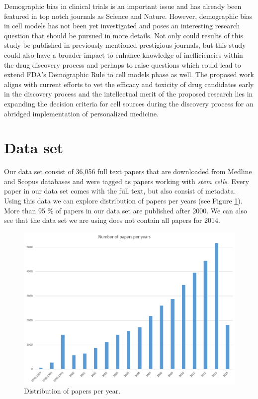 \documentclass[10pt]{article}
\begin{document}
Demographic bias in clinical trials is an important issue and has already been featured in top notch journals as Science and Nature. However, demographic bias in cell models has not been yet investigated and poses an interesting research question that should be pursued in more details. Not only could results of this study be published in previously mentioned prestigious journals, but this study could also have a broader impact to enhance knowledge of inefficiencies within the drug discovery process and perhaps to raise questions which could lead to extend FDA's Demographic Rule to cell models phase as well. The proposed work aligns with current efforts to vet the efficacy and toxicity of drug candidates early in the discovery process and the intellectual merit of the proposed research lies in expanding the decision criteria for cell sources during the discovery process for an abridged implementation of personalized medicine. 


\section{Data set}

Our data set consist of 36,056 full text papers that are downloaded from Medline and Scopus databases and were tagged as papers working with \textit{stem cells}. Every paper in our data set comes with the full text, but also consist of metadata. Using this data we can explore distribution of papers per years (see Figure \ref{dist1}). More than 95 \% of papers in our data set are published after 2000. We can also see that the data set we are using does not contain all papers for 2014. 

\begin{figure}[b!]
\centering
\includegraphics[width=0.98\columnwidth]{Figures/Figure1.png}
\caption{\label{dist1}Distribution of papers per year.}
\end{figure}
\end{document}
